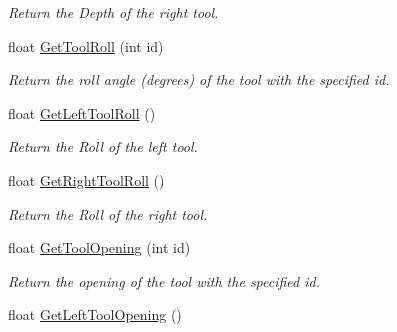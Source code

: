 \begin{DoxyCompactItemize}
\begin{DoxyCompactList}\small\item\em Return the Depth of the right tool. \item\end{DoxyCompactList}\item 
\hypertarget{classvtkIHP_a7e669f18fb17a52359ce3968925af610}{
float \hyperlink{classvtkIHP_a7e669f18fb17a52359ce3968925af610}{GetToolRoll} (int id)}
\label{classvtkIHP_a7e669f18fb17a52359ce3968925af610}

\begin{DoxyCompactList}\small\item\em Return the roll angle (degrees) of the tool with the specified id. \item\end{DoxyCompactList}\item 
\hypertarget{classvtkIHP_aba1bd3e7898f4b119225cd6fb6782bf4}{
float \hyperlink{classvtkIHP_aba1bd3e7898f4b119225cd6fb6782bf4}{GetLeftToolRoll} ()}
\label{classvtkIHP_aba1bd3e7898f4b119225cd6fb6782bf4}

\begin{DoxyCompactList}\small\item\em Return the Roll of the left tool. \item\end{DoxyCompactList}\item 
\hypertarget{classvtkIHP_aaf3c5d7a07e13ad75e3d575b45df6a98}{
float \hyperlink{classvtkIHP_aaf3c5d7a07e13ad75e3d575b45df6a98}{GetRightToolRoll} ()}
\label{classvtkIHP_aaf3c5d7a07e13ad75e3d575b45df6a98}

\begin{DoxyCompactList}\small\item\em Return the Roll of the right tool. \item\end{DoxyCompactList}\item 
\hypertarget{classvtkIHP_a8f60174d2f0b00d8ee7141e694b1c026}{
float \hyperlink{classvtkIHP_a8f60174d2f0b00d8ee7141e694b1c026}{GetToolOpening} (int id)}
\label{classvtkIHP_a8f60174d2f0b00d8ee7141e694b1c026}

\begin{DoxyCompactList}\small\item\em Return the opening of the tool with the specified id. \item\end{DoxyCompactList}\item 
\hypertarget{classvtkIHP_a95cd78b39f4081a076bd4ed2d6461665}{
float \hyperlink{classvtkIHP_a95cd78b39f4081a076bd4ed2d6461665}{GetLeftToolOpening} ()}
\label{classvtkIHP_a95cd78b39f4081a076bd4ed2d6461665}


\end{DoxyCompactItemize}
